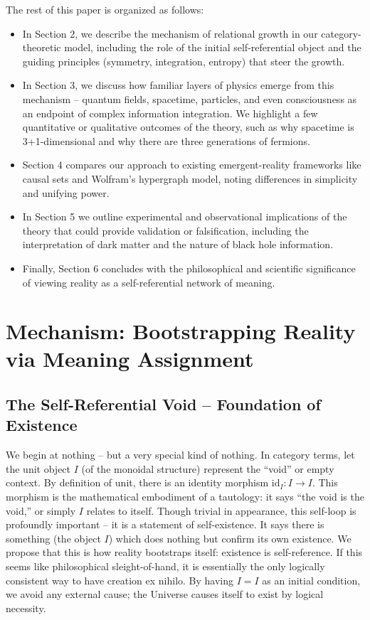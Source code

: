 \documentclass{article}
\begin{document}
The rest of this paper is organized as follows:
\begin{itemize}
\item In Section 2, we describe the mechanism of relational growth in our category-theoretic model, including the role of the initial self-referential object and the guiding principles (symmetry, integration, entropy) that steer the growth.
\item In Section 3, we discuss how familiar layers of physics emerge from this mechanism -- quantum fields, spacetime, particles, and even consciousness as an endpoint of complex information integration. We highlight a few quantitative or qualitative outcomes of the theory, such as why spacetime is 3+1-dimensional and why there are three generations of fermions.
\item Section 4 compares our approach to existing emergent-reality frameworks like causal sets and Wolfram’s hypergraph model, noting differences in simplicity and unifying power.
\item In Section 5 we outline experimental and observational implications of the theory that could provide validation or falsification, including the interpretation of dark matter and the nature of black hole information.
\item Finally, Section 6 concludes with the philosophical and scientific significance of viewing reality as a self-referential network of meaning.
\end{itemize}


\section{Mechanism: Bootstrapping Reality via Meaning Assignment}

\subsection{The Self-Referential Void – Foundation of Existence}

We begin at nothing – but a very special kind of nothing. In category terms, let the unit object $I$ (of the monoidal structure) represent the “void” or empty context. By definition of unit, there is an identity morphism $\mathrm{id}_I: I \to I$. This morphism is the mathematical embodiment of a tautology: it says “the void is the void,” or simply $I$ relates to itself. Though trivial in appearance, this self-loop is profoundly important – it is a statement of self-existence. It says there is something (the object $I$) which does nothing but confirm its own existence. We propose that this is how reality bootstraps itself: existence is self-reference. If this seems like philosophical sleight-of-hand, it is essentially the only logically consistent way to have creation ex nihilo. By having $I = I$ as an initial condition, we avoid any external cause; the Universe causes itself to exist by logical necessity.
\end{document}
